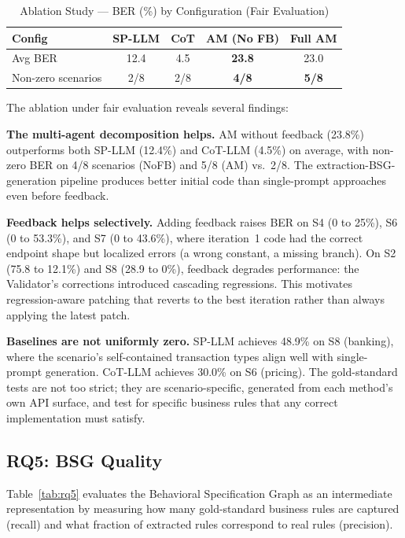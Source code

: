 \documentclass[conference]{IEEEtran}
\begin{document}
\begin{table}[htbp]
\caption{Ablation Study --- BER (\%) by Configuration (Fair Evaluation)}
\label{tab:rq4}
\centering
\footnotesize
\begin{tabular}{@{}lcccc@{}}
\toprule
\textbf{Config} & \textbf{SP-LLM} & \textbf{CoT} & \textbf{AM (No FB)} & \textbf{Full AM} \\
\midrule
Avg BER & 12.4 & 4.5 & \textbf{23.8} & 23.0 \\
Non-zero scenarios & 2/8 & 2/8 & \textbf{4/8} & \textbf{5/8} \\
\bottomrule
\end{tabular}
\end{table}

The ablation under fair evaluation reveals several findings:

\textbf{The multi-agent decomposition helps.} AM without feedback (23.8\%) outperforms both SP-LLM (12.4\%) and CoT-LLM (4.5\%) on average, with non-zero BER on 4/8 scenarios (NoFB) and 5/8 (AM) vs.\ 2/8. The extraction-BSG-generation pipeline produces better initial code than single-prompt approaches even before feedback.

\textbf{Feedback helps selectively.} Adding feedback raises BER on S4 (0 to 25\%), S6 (0 to 53.3\%), and S7 (0 to 43.6\%), where iteration~1 code had the correct endpoint shape but localized errors (a wrong constant, a missing branch). On S2 (75.8 to 12.1\%) and S8 (28.9 to 0\%), feedback degrades performance: the Validator's corrections introduced cascading regressions. This motivates regression-aware patching that reverts to the best iteration rather than always applying the latest patch.

\textbf{Baselines are not uniformly zero.} SP-LLM achieves 48.9\% on S8 (banking), where the scenario's self-contained transaction types align well with single-prompt generation. CoT-LLM achieves 30.0\% on S6 (pricing). The gold-standard tests are not too strict; they are scenario-specific, generated from each method's own API surface, and test for specific business rules that any correct implementation must satisfy.

\subsection{RQ5: BSG Quality}

Table~\ref{tab:rq5} evaluates the Behavioral Specification Graph as an intermediate representation by measuring how many gold-standard business rules are captured (recall) and what fraction of extracted rules correspond to real rules (precision).
\end{document}

